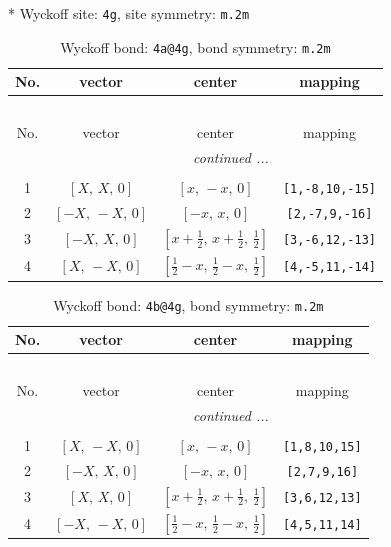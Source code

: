 \documentclass[fleqn,8pt]{jsarticle}
\begin{document}
* Wyckoff site: {\tt 4g}, site symmetry: {\tt m.2m}
\renewcommand{\arraystretch}{1.2}
\begin{longtable}{cccc}
\caption{Wyckoff bond: {\tt 4a@4g}, bond symmetry: {\tt m.2m}}
 \\
 \hline \hline
No. & vector & center & mapping \\ \hline \endfirsthead

\multicolumn{3}{l}{\tablename\ \thetable{}} \\
 \hline \hline
No. & vector & center & mapping \\ \hline \endhead

 \hline \hline
\multicolumn{3}{r}{\footnotesize\it continued ...} \\ \endfoot

 \hline \hline
\multicolumn{3}{r}{} \\ \endlastfoot

1 & $\left[ X,\, X,\, 0 \right]$ & $\left[ x,\, - x,\, 0 \right]$ & {\tt [1,-8,10,-15]} \\ \hline
2 & $\left[ - X,\, - X,\, 0 \right]$ & $\left[ - x,\, x,\, 0 \right]$ & {\tt [2,-7,9,-16]} \\ \hline
3 & $\left[ - X,\, X,\, 0 \right]$ & $\left[ x + \frac{1}{2},\, x + \frac{1}{2},\, \frac{1}{2} \right]$ & {\tt [3,-6,12,-13]} \\ \hline
4 & $\left[ X,\, - X,\, 0 \right]$ & $\left[ \frac{1}{2} - x,\, \frac{1}{2} - x,\, \frac{1}{2} \right]$ & {\tt [4,-5,11,-14]} \\
\end{longtable}
\renewcommand{\arraystretch}{1.2}
\begin{longtable}{cccc}
\caption{Wyckoff bond: {\tt 4b@4g}, bond symmetry: {\tt m.2m}}
 \\
 \hline \hline
No. & vector & center & mapping \\ \hline \endfirsthead

\multicolumn{3}{l}{\tablename\ \thetable{}} \\
 \hline \hline
No. & vector & center & mapping \\ \hline \endhead

 \hline \hline
\multicolumn{3}{r}{\footnotesize\it continued ...} \\ \endfoot

 \hline \hline
\multicolumn{3}{r}{} \\ \endlastfoot

1 & $\left[ X,\, - X,\, 0 \right]$ & $\left[ x,\, - x,\, 0 \right]$ & {\tt [1,8,10,15]} \\ \hline
2 & $\left[ - X,\, X,\, 0 \right]$ & $\left[ - x,\, x,\, 0 \right]$ & {\tt [2,7,9,16]} \\ \hline
3 & $\left[ X,\, X,\, 0 \right]$ & $\left[ x + \frac{1}{2},\, x + \frac{1}{2},\, \frac{1}{2} \right]$ & {\tt [3,6,12,13]} \\ \hline
4 & $\left[ - X,\, - X,\, 0 \right]$ & $\left[ \frac{1}{2} - x,\, \frac{1}{2} - x,\, \frac{1}{2} \right]$ & {\tt [4,5,11,14]} \\
\end{longtable}
\end{document}
